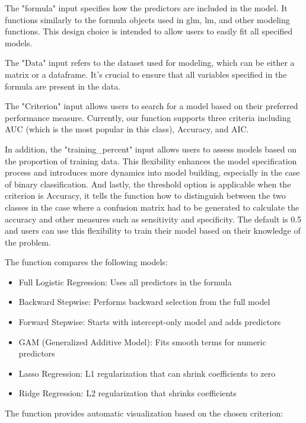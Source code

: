 \documentclass[a4paper]{book}
\begin{document}
%
\begin{Details}
The "formula" input specifies how the predictors are included in the model. It functions similarly to the formula objects used in glm, lm, and other modeling functions. This design choice is intended to allow users to easily fit all specified models.

The "Data" input refers to the dataset used for modeling, which can be either a matrix or a dataframe. It's crucial to ensure that all variables specified in the formula are present in the data.

The "Criterion" input allows users to search for a model based on their preferred performance measure. Currently, our function supports three criteria including AUC (which is the most popular in this class), Accuracy, and AIC.

In addition, the "training\_percent" input allows users to assess models based on the proportion of training data. This flexibility enhances the model specification process and introduces more dynamics into model building, especially in the case of binary classification. And lastly, the threshold option is applicable when the criterion is Accuracy, it tells the function how to distinguish between the two classes in the case where a confusion matrix had to be generated to calculate the accuracy and other measures such as sensitivity and specificity. The default is 0.5 and users can use this flexibility to train their model based on their knowledge of the problem.

The function compares the following models:
\begin{itemize}

\item{} Full Logistic Regression: Uses all predictors in the formula
\item{} Backward Stepwise: Performs backward selection from the full model
\item{} Forward Stepwise: Starts with intercept-only model and adds predictors
\item{} GAM (Generalized Additive Model): Fits smooth terms for numeric predictors
\item{} Lasso Regression: L1 regularization that can shrink coefficients to zero
\item{} Ridge Regression: L2 regularization that shrinks coefficients

\end{itemize}


The function provides automatic visualization based on the chosen criterion:
\begin{itemize}


\end{itemize}
\end{Details}
\end{document}
